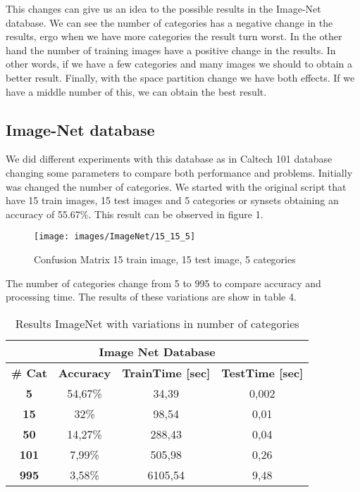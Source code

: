 \documentclass[10pt,twocolumn,letterpaper]{article}
\begin{document}
This changes can give us an idea to the possible results in the Image-Net database. We can see the number of categories has a negative change in the results, ergo when we have more categories the result turn worst. In the other hand the number of training images have a positive change in the results. In other words, if we have a few categories and many images we should to obtain a better result. Finally, with the space partition change we have both effects. If we have a middle number of this, we can obtain the best result.

\subsection{ Image-Net database}

We did different experiments with this database as in Caltech 101 database changing some parameters to compare both performance and problems. Initially was changed the number of categories. We started with the original script that have 15 train images, 15 test images and 5 categories or synsets obtaining an accuracy of 55.67\%. This result can be observed in figure 1. 

\begin{figure}[H]  \texttt{[image: images/ImageNet/15\_15\_5]}\caption{Confusion Matrix 15 train image, 15 test image, 5 categories}\label{Comp}\end{figure}
The number of categories change from 5 to 995 to compare accuracy and processing time. The results of these variations are show in table 4. 

\begin{table}[H]
\centering
\caption{Results ImageNet with variations in number of categories}
\label{my-label}
\begin{tabular}{|c|c|c|c|}
\hline
\multicolumn{4}{|c|}{\textbf{Image Net Database}} \\ \hline
\textbf{# Cat} & \multicolumn{1}{c|}{\textbf{Accuracy}} & \multicolumn{1}{c|}{\textbf{TrainTime {[}sec{]}}} & \multicolumn{1}{c|}{\textbf{TestTime {[}sec{]}}} \\ \hline
\textbf{5} & 54,67\% & 34,39 & 0,002 \\ \hline
\textbf{15} & 32\% & 98,54 & 0,01 \\ \hline
\textbf{50} & 14,27\% & 288,43 & 0,04 \\ \hline
\textbf{101} & 7,99\% & 505,98 & 0,26 \\ \hline
\textbf{995} & 3,58\% & 6105,54 & 9,48 \\ \hline

\end{tabular}
\end{table}
\end{document}
